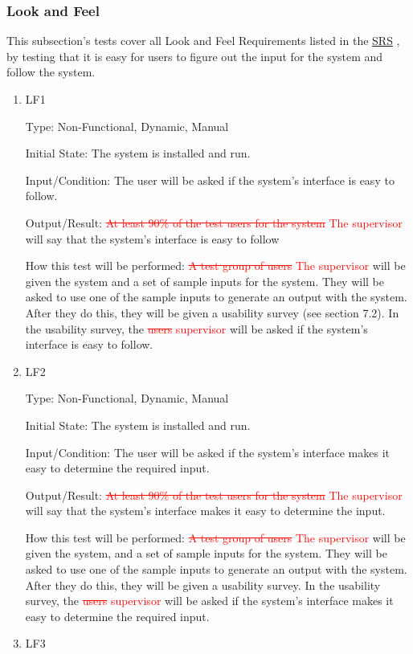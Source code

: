 \documentclass[12pt, titlepage]{article}
\begin{document}
\subsubsection{Look and Feel}
This subsection's tests cover all Look and Feel Requirements listed in the \href{https://github.com/paezha/PyERT-BLACK/blob/main/docs/SRS/SRS.pdf}{SRS} \citep{SRS}, by testing that it is easy for users to figure out the input for the system and follow the system. 

\begin{enumerate}

\item{LF1\\}\label{LF1}

Type: Non-Functional, Dynamic, Manual
					
Initial State: 
The system is installed and run.		

Input/Condition: 
The user will be asked if the system's interface is easy to follow.	

Output/Result: 
\textcolor{red}{\sout{At least 90\% of the test users for the system} The supervisor} will say that the system's interface is easy to follow
					
How this test will be performed:
\textcolor{red}{\sout{A test group of users} The supervisor } will be given the system and a set of sample inputs for the system. They will be asked to use one of the sample inputs to generate an output with the system. After they do this, they will be given a usability survey (see section 7.2). In the usability survey, the \textcolor{red}{\sout{users} supervisor}  will be asked if the system's interface is easy to follow.
\\
\item{LF2\\}\label{LF2}

Type: Non-Functional, Dynamic, Manual
					
Initial State: 
The system is installed and run.

Input/Condition: 
The user will be asked if the system's interface makes it easy to determine the required input.			

Output/Result: 
\textcolor{red}{\sout{At least 90\% of the test users for the system} The supervisor} will say that the system's interface makes it easy to determine the input.
					
How this test will be performed:
\textcolor{red}{\sout{A test group of users } The supervisor} will be given the system, and a set of sample inputs for the system. They will be asked to use one of the sample inputs to generate an output with the system. After they do this, they will be given a usability survey. In the usability survey, the \textcolor{red}{\sout{users} supervisor} will be asked if the system's interface makes it easy to determine the required input.	
\\
\item{LF3\\}\label{LF3}


\end{enumerate}
\end{document}
